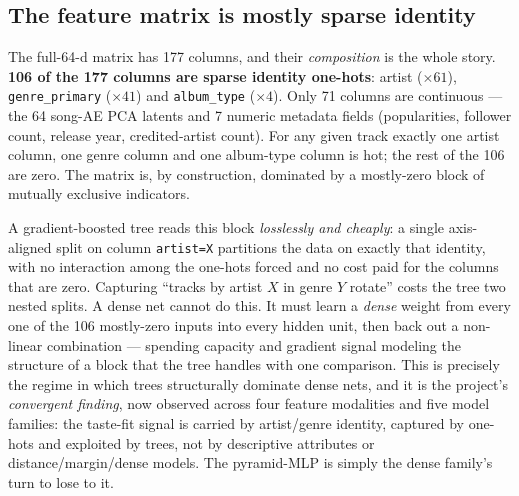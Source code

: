 \documentclass[11pt]{article}
\begin{document}
\subsection{The feature matrix is mostly sparse identity}
\label{sec:anns-matrix}
The full-64-d matrix has 177 columns, and their \emph{composition} is the whole
story. \textbf{106 of the 177 columns are sparse identity one-hots}: artist
($\times 61$), \texttt{genre\_primary} ($\times 41$) and \texttt{album\_type}
($\times 4$). Only 71 columns are continuous --- the 64 song-AE PCA latents and
7 numeric metadata fields (popularities, follower count, release year,
credited-artist count). For any given track exactly one artist column, one genre
column and one album-type column is hot; the rest of the 106 are zero. The
matrix is, by construction, dominated by a mostly-zero block of mutually
exclusive indicators.

A gradient-boosted tree reads this block \emph{losslessly and cheaply}: a single
axis-aligned split on column \texttt{artist=X} partitions the data on exactly
that identity, with no interaction among the one-hots forced and no cost paid for
the columns that are zero. Capturing ``tracks by artist $X$ in genre $Y$ rotate''
costs the tree two nested splits. A dense net cannot do this. It must learn a
\emph{dense} weight from every one of the 106 mostly-zero inputs into every
hidden unit, then back out a non-linear combination --- spending capacity and
gradient signal modeling the structure of a block that the tree handles with one
comparison. This is precisely the regime in which trees structurally dominate
dense nets, and it is the project's \emph{convergent finding}, now observed
across four feature modalities and five model families: the taste-fit signal is
carried by artist/genre identity, captured by one-hots and exploited by trees,
not by descriptive attributes or distance/margin/dense models. The pyramid-MLP
is simply the dense family's turn to lose to it.
\end{document}
